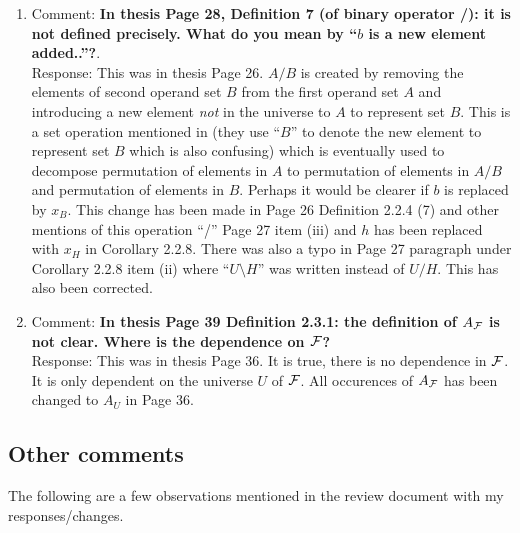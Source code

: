 \documentclass[12pt,a4paper]{article}
\begin{document}
\begin{enumerate}
\item Comment: {\bf In thesis Page 28, Definition 7 (of binary
    operator /): it is not defined precisely. What do you mean by
    ``$b$ is a new element added..''?}.\\
  Response: This was in thesis Page 26. $A/B$ is created by removing
  the elements of second operand set $B$ from the first operand set
  $A$ and introducing a new element {\em not} in the universe to $A$
  to represent set $B$. This is a set operation mentioned in
  \cite{mm96} (they use ``$B$'' to denote the new element to represent
  set $B$ which is also confusing) which is eventually used to
  decompose permutation of elements in $A$ to permutation of elements
  in $A/B$ and permutation of elements in $B$.  Perhaps it would be
  clearer if $b$ is replaced by $x_B$. This change has been made in
  Page 26 Definition 2.2.4 (7) and other mentions of this operation
  ``/'' Page 27 item (iii) and $h$ has been replaced with $x_H$ in
  Corollary 2.2.8. There was also a typo in Page 27 paragraph under
  Corollary 2.2.8 item (ii) where ``$U \setminus H$'' was written
  instead of $U / H$.  This has also been corrected.

\item Comment: {\bf In thesis Page 39 Definition 2.3.1: the definition
    of $A_{\cal F}$ is not clear. Where is the dependence on ${\cal F}$?}\\
  Response: This was in thesis Page 36. It is true, there is no
  dependence in ${\cal F}$. It is only dependent on the universe $U$ of
  ${\cal F}$. All occurences of $A_{\cal F}$ has been changed to $A_U$ in Page
  36.
\end{enumerate}


\subsection{Other comments}
The following are a few observations mentioned in the review document
with my responses/changes.
\end{document}
